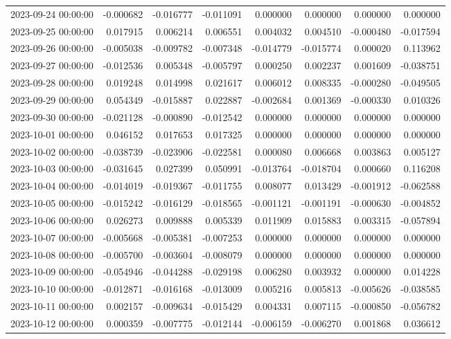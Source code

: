 \begin{tabular}{lrrrrrrr}
2023-09-24 00:00:00 & -0.000682 & -0.016777 & -0.011091 & 0.000000 & 0.000000 & 0.000000 & 0.000000 \\
2023-09-25 00:00:00 & 0.017915 & 0.006214 & 0.006551 & 0.004032 & 0.004510 & -0.000480 & -0.017594 \\
2023-09-26 00:00:00 & -0.005038 & -0.009782 & -0.007348 & -0.014779 & -0.015774 & 0.000020 & 0.113962 \\
2023-09-27 00:00:00 & -0.012536 & 0.005348 & -0.005797 & 0.000250 & 0.002237 & 0.001609 & -0.038751 \\
2023-09-28 00:00:00 & 0.019248 & 0.014998 & 0.021617 & 0.006012 & 0.008335 & -0.000280 & -0.049505 \\
2023-09-29 00:00:00 & 0.054349 & -0.015887 & 0.022887 & -0.002684 & 0.001369 & -0.000330 & 0.010326 \\
2023-09-30 00:00:00 & -0.021128 & -0.000890 & -0.012542 & 0.000000 & 0.000000 & 0.000000 & 0.000000 \\
2023-10-01 00:00:00 & 0.046152 & 0.017653 & 0.017325 & 0.000000 & 0.000000 & 0.000000 & 0.000000 \\
2023-10-02 00:00:00 & -0.038739 & -0.023906 & -0.022581 & 0.000080 & 0.006668 & 0.003863 & 0.005127 \\
2023-10-03 00:00:00 & -0.031645 & 0.027399 & 0.050991 & -0.013764 & -0.018704 & 0.000660 & 0.116208 \\
2023-10-04 00:00:00 & -0.014019 & -0.019367 & -0.011755 & 0.008077 & 0.013429 & -0.001912 & -0.062588 \\
2023-10-05 00:00:00 & -0.015242 & -0.016129 & -0.018565 & -0.001121 & -0.001191 & -0.000630 & -0.004852 \\
2023-10-06 00:00:00 & 0.026273 & 0.009888 & 0.005339 & 0.011909 & 0.015883 & 0.003315 & -0.057894 \\
2023-10-07 00:00:00 & -0.005668 & -0.005381 & -0.007253 & 0.000000 & 0.000000 & 0.000000 & 0.000000 \\
2023-10-08 00:00:00 & -0.005700 & -0.003604 & -0.008079 & 0.000000 & 0.000000 & 0.000000 & 0.000000 \\
2023-10-09 00:00:00 & -0.054946 & -0.044288 & -0.029198 & 0.006280 & 0.003932 & 0.000000 & 0.014228 \\
2023-10-10 00:00:00 & -0.012871 & -0.016168 & -0.013009 & 0.005216 & 0.005813 & -0.005626 & -0.038585 \\
2023-10-11 00:00:00 & 0.002157 & -0.009634 & -0.015429 & 0.004331 & 0.007115 & -0.000850 & -0.056782 \\
2023-10-12 00:00:00 & 0.000359 & -0.007775 & -0.012144 & -0.006159 & -0.006270 & 0.001868 & 0.036612 \\

\end{tabular}
